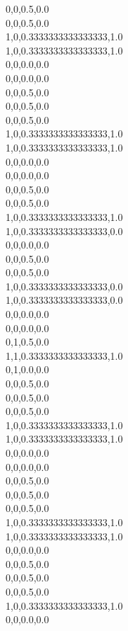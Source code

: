 0,0,0.5,0.0\\
0,0,0.5,0.0\\
1,0,0.3333333333333333,1.0\\
1,0,0.3333333333333333,1.0\\
0,0,0.0,0.0\\
0,0,0.0,0.0\\
0,0,0.5,0.0\\
0,0,0.5,0.0\\
0,0,0.5,0.0\\
1,0,0.3333333333333333,1.0\\
1,0,0.3333333333333333,1.0\\
0,0,0.0,0.0\\
0,0,0.0,0.0\\
0,0,0.5,0.0\\
0,0,0.5,0.0\\
1,0,0.3333333333333333,1.0\\
1,0,0.3333333333333333,0.0\\
0,0,0.0,0.0\\
0,0,0.5,0.0\\
0,0,0.5,0.0\\
1,0,0.3333333333333333,0.0\\
1,0,0.3333333333333333,0.0\\
0,0,0.0,0.0\\
0,0,0.0,0.0\\
0,1,0.5,0.0\\
1,1,0.3333333333333333,1.0\\
0,1,0.0,0.0\\
0,0,0.5,0.0\\
0,0,0.5,0.0\\
0,0,0.5,0.0\\
1,0,0.3333333333333333,1.0\\
1,0,0.3333333333333333,1.0\\
0,0,0.0,0.0\\
0,0,0.0,0.0\\
0,0,0.5,0.0\\
0,0,0.5,0.0\\
0,0,0.5,0.0\\
1,0,0.3333333333333333,1.0\\
1,0,0.3333333333333333,1.0\\
0,0,0.0,0.0\\
0,0,0.5,0.0\\
0,0,0.5,0.0\\
0,0,0.5,0.0\\
1,0,0.3333333333333333,1.0\\
0,0,0.0,0.0\\
